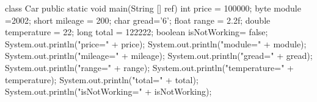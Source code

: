class Car{
public static void main(String [] ref){
int price = 100000;
byte module =2002;
short mileage = 200;
char gread='6';
float range = 2.2f;
double temperature = 22;
long total = 122222;
boolean isNotWorking= false;{
System.out.println("price=" + price);
System.out.println("module=" + module);
System.out.println("mileage=" + mileage);
System.out.println("gread=" + gread);
System.out.println("range=" + range);
System.out.println("temperature=" + temperature);
System.out.println("total=" + total);
System.out.println("isNotWorking=" + isNotWorking);
}
}
}